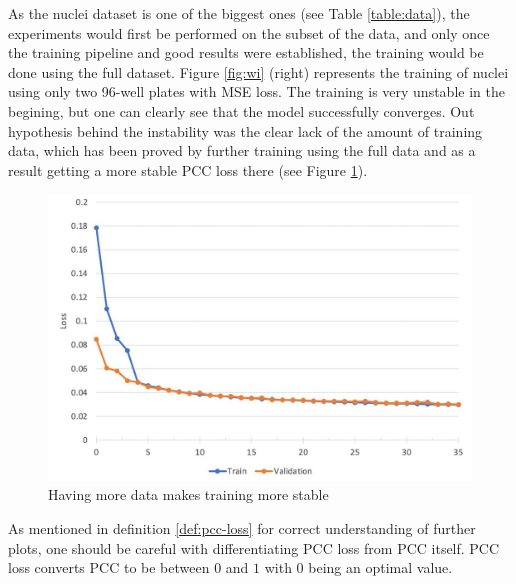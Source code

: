 

As the nuclei dataset is one of the biggest ones (see Table \ref{table:data}), the experiments would first be performed on the subset of the data, and only once the training pipeline and good results were established, the training would be done using the full dataset. Figure \ref{fig:wi} (right) represents the training of nuclei using only two 96-well plates with MSE loss. The training is very unstable in the begining, but one can clearly see that the model successfully converges. Out hypothesis behind the instability was the clear lack of the amount of training data, which has been proved by further training using the full data and as a result getting a more stable PCC loss there (see Figure \ref{fig:full-dataset-pcc}).

\begin{figure}[H]
	\begin{center}
		\includegraphics[width=0.5\linewidth]{bilder/nuclei/full-dataset.jpg}
		\caption{Having more data makes training more stable}\label{fig:full-dataset-pcc}
	\end{center}
\end{figure}

As mentioned in definition \ref{def:pcc-loss} for correct understanding of further plots, one should be careful with differentiating PCC loss from PCC itself. PCC loss converts PCC to be between $0$ and $1$ with $0$ being an optimal value.

